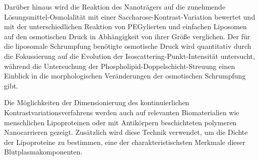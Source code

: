 Darüber hinaus wird die Reaktion des Nanoträgers auf die zunehmende Lösungsmittel-Osmolalität mit einer Saccharose-Kontrast-Variation bewertet und mit der unterschiedlichen Reaktion von PEGylierten und einfachen Liposomen auf den osmotischen Druck in Abhängigkeit von ihrer Größe verglichen. Der für die liposomale Schrumpfung benötigte osmotische Druck wird quantitativ durch die Fokussierung auf die Evolution der Isoscattering-Punkt-Intensität untersucht, während die Untersuchung der Phospholipid-Doppelschicht-Streuung einen Einblick in die morphologischen Veränderungen der osmotischen Schrumpfung gibt.

Die Möglichkeiten der Dimensionierung des kontinuierlichen Kontrastvariationsverfahrens werden auch auf relevanten Biomaterialien wie menschlichen Lipoproteinen oder mit Antikörpern beschichteten polymeren Nanocarrieren gezeigt. Zusätzlich wird diese Technik verwendet, um die Dichte der Lipoproteine zu bestimmen, eine der charakteristischsten Merkmale dieser Blutplasmakomponenten.





\normalsize

\cleardoublepage
